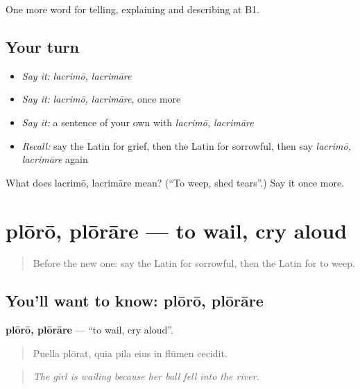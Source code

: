 \begin{grammarlens}[title={What you've built}]
One more word for telling, explaining and describing at B1.
\end{grammarlens}

\subsection*{Your turn}
\begin{itemize}
\raggedright
  \item \emph{Say it:} \emph{lacrimō, lacrimāre}
  \item \emph{Say it:} \emph{lacrimō, lacrimāre}, once more
  \item \emph{Say it:} a sentence of your own with \emph{lacrimō, lacrimāre}
  \item \emph{Recall:} say the Latin for grief, then the Latin for sorrowful, then say \emph{lacrimō, lacrimāre} again
\end{itemize}

\begin{tcolorbox}[breakable,colback=teal!4,colframe=teal!35!black,title={Before you move on}]
What does lacrimō, lacrimāre mean? (\textquotedblleft{}To weep, shed tears\textquotedblright{}.) Say it once more.
\end{tcolorbox}
\section[plōrō, plōrāre]{plōrō, plōrāre — to wail, cry aloud}

\label{lesson:LA-C491-ploro}



\begin{quote}
Before the new one: say the Latin for sorrowful, then the Latin for to weep.
\end{quote}

\subsection*{You'll want to know: plōrō, plōrāre}
\textbf{plōrō, plōrāre} — \textquotedblleft{}to wail, cry aloud\textquotedblright{}.

\begin{quote}
Puella plōrat, quia pila eius in flūmen cecidit.
\end{quote}

\begin{quote}
\emph{The girl is wailing because her ball fell into the river.}
\end{quote}

